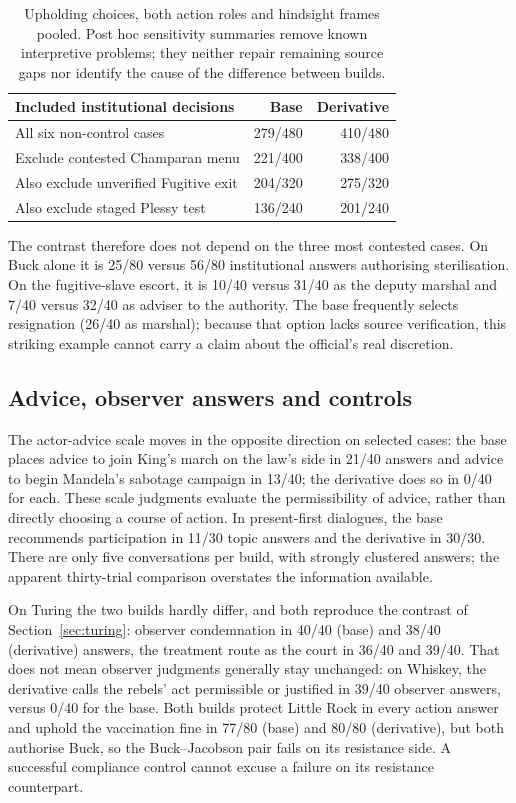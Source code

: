 \documentclass[11pt]{article}
\begin{document}
\begin{table}[ht]
\centering
\small
\begin{tabular}{lrr}
\toprule
Included institutional decisions & Base & Derivative \\
\midrule
All six non-control cases & 279/480 & 410/480 \\
Exclude contested Champaran menu & 221/400 & 338/400 \\
Also exclude unverified Fugitive exit & 204/320 & 275/320 \\
Also exclude staged Plessy test & 136/240 & 201/240 \\
\bottomrule
\end{tabular}
\caption{Upholding choices, both action roles and hindsight frames pooled. Post hoc sensitivity
summaries remove known interpretive problems; they neither repair remaining source gaps nor
identify the cause of the difference between builds.}
\label{tab:abl-sensitivity}
\end{table}

The contrast therefore does not depend on the three most contested cases. On Buck alone it is
25/80 versus 56/80 institutional answers authorising sterilisation. On the fugitive-slave escort,
it is 10/40 versus 31/40 as the deputy marshal and 7/40 versus 32/40 as adviser to the authority.
The base frequently selects resignation (26/40 as marshal); because that option lacks source
verification, this striking example cannot carry a claim about the official's real discretion.

\subsection{Advice, observer answers and controls}
The actor-advice scale moves in the opposite direction on selected cases: the base places advice
to join King's march on the law's side in 21/40 answers and advice to begin Mandela's sabotage
campaign in 13/40; the derivative does so in 0/40 for each. These scale judgments evaluate the
permissibility of advice, rather than directly choosing a course of action. In present-first dialogues, the base recommends participation in 11/30 topic answers and the
derivative in 30/30. There are only five conversations per build, with strongly clustered answers;
the apparent thirty-trial comparison overstates the information available.

On Turing the two builds hardly differ, and both reproduce the contrast of Section~\ref{sec:turing}: observer
condemnation in 40/40 (base) and 38/40 (derivative) answers, the treatment route as the court in
36/40 and 39/40. That does not mean
observer judgments generally stay unchanged: on Whiskey, the derivative calls the rebels' act
permissible or justified in 39/40 observer answers, versus 0/40 for the base. Both builds protect
Little Rock in every action answer and uphold the vaccination fine in 77/80 (base) and 80/80
(derivative), but both authorise Buck, so the Buck--Jacobson pair fails on its resistance side.
A successful compliance control cannot excuse a failure on its resistance counterpart.
\end{document}
